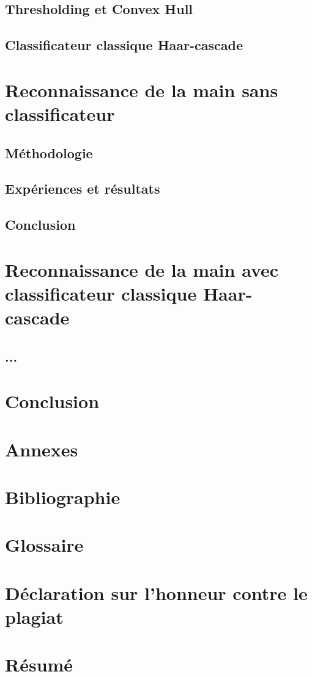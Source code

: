 \documentclass[11pt]{article}
\begin{document}
\subsection{Thresholding et Convex Hull}
\subsection{Classificateur classique Haar-cascade}
\newpage

\section{Reconnaissance de la main sans classificateur}
\subsection{Méthodologie}
\subsection{Expériences et résultats}
\subsection{Conclusion}
\newpage

\section{Reconnaissance de la main avec classificateur classique Haar-cascade}
\subsection{...}

\section*{Conclusion}
\newpage

\section*{Annexes}

\section*{Bibliographie}
\newpage

\section*{Glossaire}

\section*{Déclaration sur l'honneur contre le plagiat}

\newpage

\newpage
\section*{Résumé}
\end{document}
